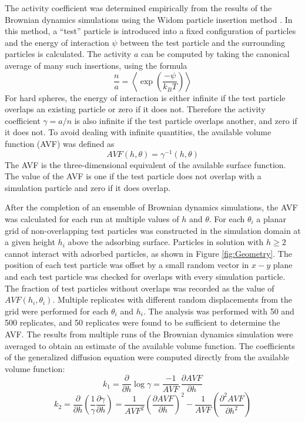The activity coefficient was determined empirically from the results
of the Brownian dynamics simulations using the Widom particle insertion
method \cite{Widom1963,Dullens2005}. In this method, a {}``test''
particle is introduced into a fixed configuration of particles and
the energy of interaction $\psi$ between the test particle and the
surrounding particles is calculated. The activity $a$ can be computed
by taking the canonical average of many such insertions, using the
formula\begin{equation}
\frac{n}{a}=\left\langle \exp\left(\frac{-\psi}{k_{B}T}\right)\right\rangle \label{eq:Widom equation}\end{equation}
For hard spheres, the energy of interaction is either infinite if
the test particle overlaps an existing particle or zero if it does
not. Therefore the activity coefficient $\gamma=a/n$ is also infinite
if the test particle overlaps another, and zero if it does not. To
avoid dealing with infinite quantities, the available volume function
(AVF) was defined as \begin{equation}
AVF\left(h,\theta\right)=\gamma^{-1}\left(h,\theta\right)\label{eq:AVF}\end{equation}
The AVF is the three-dimensional equivalent of the available surface
function. The value of the AVF is one if the test particle does not
overlap with a simulation particle and zero if it does overlap. 

After the completion of an ensemble of Brownian dynamics simulations,
the AVF was calculated for each run at multiple values of $h$ and
$\theta$. For each $\theta_{i}$ a planar grid of non-overlapping
test particles was constructed in the simulation domain at a given
height $h_{i}$ above the adsorbing surface. Particles in solution
with $h\geq2$ cannot interact with adsorbed particles, as shown in
Figure \ref{fig:Geometry}. The position of each test particle was
offset by a small random vector in $x-y$ plane and each test particle
was checked for overlaps with every simulation particle. The fraction
of test particles without overlaps was recorded as the value of $AVF\left(h_{i},\theta_{i}\right)$.
Multiple replicates with different random displacements from the grid
were performed for each $\theta_{i}$ and $h_{i}$. The analysis was
performed with 50 and 500 replicates, and 50 replicates were found
to be sufficient to determine the AVF. The results from multiple runs
of the Brownian dynamics simulation were averaged to obtain an estimate
of the available volume function. The coefficients of the generalized
diffusion equation were computed directly from the available volume
function:\[
k_{1}=\frac{\partial}{\partial h}\log\gamma=\frac{-1}{AVF}\,\frac{\partial AVF}{\partial h}\]
\[
k_{2}=\frac{\partial}{\partial h}\left(\frac{1}{\gamma}\frac{\partial\gamma}{\partial h}\right)=\frac{1}{AVF^{2}}\left(\frac{\partial AVF}{\partial h}\right)^{2}-\frac{1}{AVF}\left(\frac{\partial^{2}AVF}{\partial h^{2}}\right)\]



